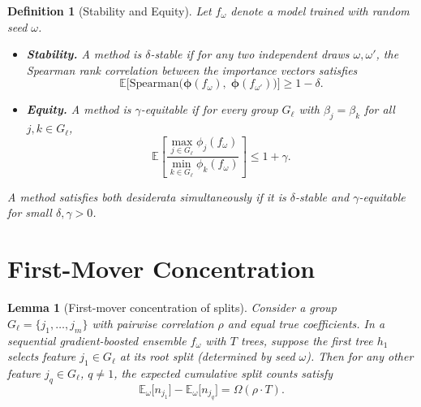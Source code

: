 \documentclass[11pt]{article}
\newtheorem{lemma}[theorem]{Lemma}
\newtheorem{definition}[theorem]{Definition}
\theoremstyle{remark}
\newcommand{\Gl}{G_\ell}                    %
\newcommand{\phij}{\phi_j}                  %
\newcommand{\phik}{\phi_k}                  %
\newcommand{\splits}[1]{n_{#1}}             %
\newcommand{\totalT}{T}                     %
\newcommand{\rhovar}{\rho}                  %
\newcommand{\Exp}{\mathbb{E}}              %
\begin{document}
\begin{definition}[Stability and Equity]
\label{def:desiderata}
Let $f_\omega$ denote a model trained with random seed $\omega$.
\begin{itemize}
  \item \textbf{Stability.} A method is $\delta$-stable if for any two
    independent draws $\omega, \omega'$, the Spearman rank correlation
    between the importance vectors satisfies
    \begin{equation}
      \Exp\bigl[\mathrm{Spearman}\bigl(
        \boldsymbol{\phi}(f_\omega),\;
        \boldsymbol{\phi}(f_{\omega'})
      \bigr)\bigr] \geq 1 - \delta.
    \end{equation}

  \item \textbf{Equity.} A method is $\gamma$-equitable if for every group
    $\Gl$ with $\beta_j = \beta_k$ for all $j, k \in \Gl$,
    \begin{equation}
      \Exp\!\left[
        \frac{\max_{j \in \Gl} \phij(f_\omega)}
             {\min_{k \in \Gl} \phik(f_\omega)}
      \right] \leq 1 + \gamma.
    \end{equation}
\end{itemize}
A method satisfies both desiderata simultaneously if it is
$\delta$-stable and $\gamma$-equitable for small $\delta, \gamma > 0$.
\end{definition}


\section{First-Mover Concentration}
\label{sec:first-mover}

\begin{lemma}[First-mover concentration of splits]
\label{lem:split-concentration}
Consider a group $\Gl = \{j_1, \dots, j_m\}$ with pairwise correlation
$\rhovar$ and equal true coefficients.  In a sequential gradient-boosted
ensemble $f_\omega$ with $\totalT$ trees, suppose the first tree $h_1$
selects feature $j_1 \in \Gl$ at its root split (determined by seed
$\omega$).  Then for any other feature $j_q \in \Gl$, $q \neq 1$, the
expected cumulative split counts satisfy
\begin{equation}
  \Exp_\omega\bigl[\splits{j_1}\bigr]
    - \Exp_\omega\bigl[\splits{j_q}\bigr]
    = \Omega(\rhovar \cdot \totalT).
  \label{eq:split-gap}
\end{equation}
\end{lemma}
\end{document}

